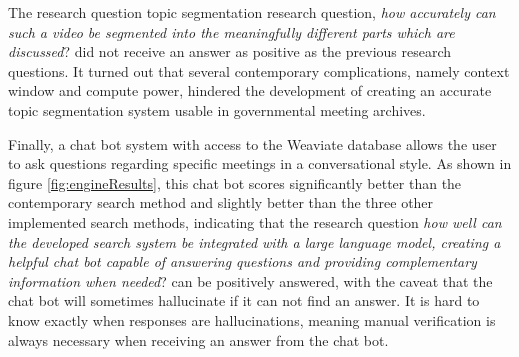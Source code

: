 \documentclass[twoside]{uva-inf-bachelor-thesis}
\begin{document}
The research question topic segmentation research question, \textit{how accurately can such a video be segmented into the meaningfully different parts which are discussed}? did not receive an answer as positive as the previous research questions. It turned out that several contemporary complications, namely context window and compute power, hindered the development of creating an accurate topic segmentation system usable in governmental meeting archives.

Finally, a chat bot system with access to the Weaviate database allows the user to ask questions regarding specific meetings in a conversational style. As shown in figure \ref{fig:engineResults}, this chat bot scores significantly better than the contemporary search method and slightly better than the three other implemented search methods, indicating that the research question \textit{how well can the developed search system be integrated with a large language model, creating a helpful chat bot capable of answering questions and providing complementary information when needed}? can be positively answered, with the caveat that the chat bot will sometimes hallucinate if it can not find an answer. It is hard to know exactly when responses are hallucinations, meaning manual verification is always necessary when receiving an answer from the chat bot.




\printbibliography
\end{document}
